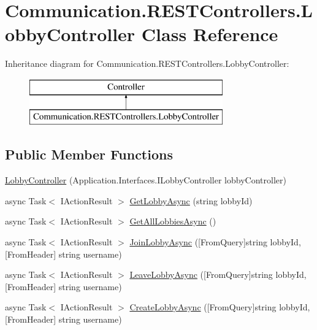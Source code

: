 \hypertarget{class_communication_1_1_r_e_s_t_controllers_1_1_lobby_controller}{}\section{Communication.\+R\+E\+S\+T\+Controllers.\+Lobby\+Controller Class Reference}
\label{class_communication_1_1_r_e_s_t_controllers_1_1_lobby_controller}
Inheritance diagram for Communication.\+R\+E\+S\+T\+Controllers.\+Lobby\+Controller\+:\begin{figure}[H]
\begin{center}
\leavevmode
\includegraphics[height=2.000000cm]{class_communication_1_1_r_e_s_t_controllers_1_1_lobby_controller}
\end{center}
\end{figure}
\subsection*{Public Member Functions}
\begin{DoxyCompactItemize}
\item 
\mbox{\hyperlink{class_communication_1_1_r_e_s_t_controllers_1_1_lobby_controller_a6966ace5382d916c0f9a9cada92aef71}{Lobby\+Controller}} (Application.\+Interfaces.\+I\+Lobby\+Controller lobby\+Controller)
\item 
async Task$<$ I\+Action\+Result $>$ \mbox{\hyperlink{class_communication_1_1_r_e_s_t_controllers_1_1_lobby_controller_a38e3aa49bd452dee823bd25bbfacef9f}{Get\+Lobby\+Async}} (string lobby\+Id)
\item 
async Task$<$ I\+Action\+Result $>$ \mbox{\hyperlink{class_communication_1_1_r_e_s_t_controllers_1_1_lobby_controller_a06d83adbec30fc919a2c69e0c3360ac0}{Get\+All\+Lobbies\+Async}} ()
\item 
async Task$<$ I\+Action\+Result $>$ \mbox{\hyperlink{class_communication_1_1_r_e_s_t_controllers_1_1_lobby_controller_a30bcfcd718a55e8c413f61d38d176ef8}{Join\+Lobby\+Async}} (\mbox{[}From\+Query\mbox{]}string lobby\+Id, \mbox{[}From\+Header\mbox{]} string username)
\item 
async Task$<$ I\+Action\+Result $>$ \mbox{\hyperlink{class_communication_1_1_r_e_s_t_controllers_1_1_lobby_controller_a85eeb02c29c53fd63d6a5d1765128854}{Leave\+Lobby\+Async}} (\mbox{[}From\+Query\mbox{]}string lobby\+Id, \mbox{[}From\+Header\mbox{]} string username)
\item 
async Task$<$ I\+Action\+Result $>$ \mbox{\hyperlink{class_communication_1_1_r_e_s_t_controllers_1_1_lobby_controller_a4586b9012b563d032cccc9d48049f6fb}{Create\+Lobby\+Async}} (\mbox{[}From\+Query\mbox{]}string lobby\+Id, \mbox{[}From\+Header\mbox{]} string username)
\end{DoxyCompactItemize}


